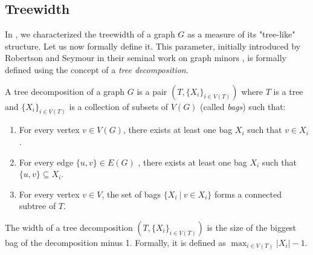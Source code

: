 
\begin{problem}
\end{problem}

\subsection{Treewidth}

In , we characterized the treewidth of a graph $G$ as a measure of its "tree-like" structure. Let us now formally define it. This parameter, initially introduced by Robertson and Seymour in their seminal work on graph minors \cite{robertson1986graph}, is formally defined using the concept of a \textit{tree decomposition}.

\begin{definition}
    A tree decomposition of a graph $G$ is a pair $(T, \{X_i\}_{i \in V(T)})$ where $T$ is a tree and $\{X_i\}_{i \in V(T)}$ is a collection of subsets of $V(G)$ (called \emph{bags}) such that:
    \begin{enumerate}
        \item For every vertex $v \in V(G)$, there exists at least one bag $X_i$ such that $v \in X_i$.
        \item For every edge $\{u, v\} \in E(G)$ , there exists at least one bag $X_i$ such that $\{u, v\} \subseteq X_i$.
        \item For every vertex $v \in V$, the set of bags $\{X_i\ |\ v \in X_i\}$ forms a connected subtree of $T$.
    \end{enumerate}
\end{definition}

\begin{definition}
    The width of a tree decomposition $(T,\{X_i\}_{i \in V(T)})$ is the size of the biggest bag of the decomposition minus 1. Formally, it is defined as $\max_{i \in V(T)} |X_i| - 1$.
\end{definition}

